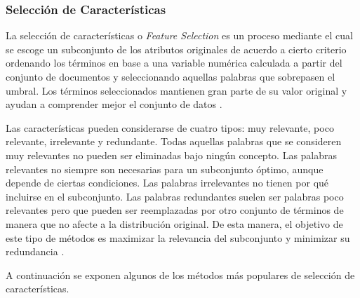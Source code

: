 \documentclass[10pt, a4paper]{article}
\begin{document}
\subsubsection{Selección de Características}

La selección de características o \textit{Feature Selection} es un proceso mediante el cual se escoge un subconjunto de los atributos originales de acuerdo a cierto criterio ordenando los términos en base a una variable numérica calculada a partir del conjunto de documentos y seleccionando aquellas palabras que sobrepasen el umbral. Los términos seleccionados mantienen gran parte de su valor original y ayudan a comprender mejor el conjunto de datos \cite{An Evaluation on Feature Selection for Text Clustering, Comparing and Combining Dimension Reduction Techniques for Efficient Text}. 

Las características pueden considerarse de cuatro tipos: muy relevante, poco relevante, irrelevante y redundante. Todas aquellas palabras que se consideren muy relevantes no pueden ser eliminadas bajo ningún concepto. Las palabras relevantes no siempre son necesarias para un subconjunto óptimo, aunque depende de ciertas condiciones. Las palabras irrelevantes no tienen por qué incluirse en el subconjunto. Las palabras redundantes suelen ser palabras poco relevantes pero que pueden ser reemplazadas por otro conjunto de términos de manera que no afecte a la distribución original. De esta manera, el objetivo de este tipo de métodos es maximizar la relevancia del subconjunto y minimizar su redundancia \cite{A review of feature selection methods with applications}.

A continuación se exponen algunos de los métodos más populares de selección de características.
\end{document}
